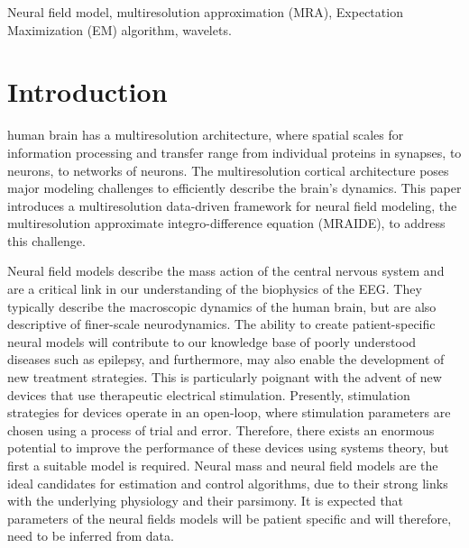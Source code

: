 \documentclass[journal,a4paper]{IEEEtran}
\begin{document}
\begin{IEEEkeywords}
Neural field model, multiresolution approximation (MRA), Expectation Maximization (EM) algorithm, wavelets.
\end{IEEEkeywords}

\IEEEpeerreviewmaketitle

\section{Introduction}
 human brain has a multiresolution architecture, where spatial scales for information processing and transfer range from individual proteins in synapses, to neurons, to networks of neurons. The multiresolution cortical architecture poses major modeling challenges to efficiently describe the brain's dynamics. This paper introduces a multiresolution data-driven framework for neural field modeling, the multiresolution approximate integro-difference equation (MRAIDE), to address this challenge. 

Neural field models describe the mass action of the central nervous system and are a critical link in our understanding of the biophysics of the EEG. They typically describe the macroscopic dynamics of the human brain, but are also descriptive of finer-scale neurodynamics. The ability to create patient-specific neural models will contribute to our knowledge base of poorly understood diseases such as epilepsy, and furthermore, may also enable the development of new treatment strategies. This is particularly poignant with the advent of new devices that use therapeutic electrical stimulation. Presently, stimulation strategies for devices operate in an open-loop, where stimulation parameters are chosen using a process of trial and error. Therefore, there exists an enormous potential to improve the performance of these devices using systems theory, but first a suitable model is required. Neural mass and neural field models are the ideal candidates for estimation and control algorithms, due to their strong links with the underlying physiology and their parsimony. It is expected that parameters of the neural fields models will be patient specific and will therefore, need to be inferred from data.
\end{document}
